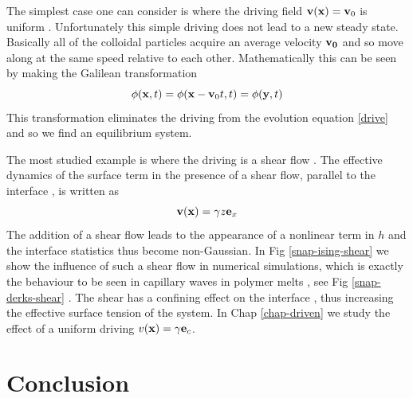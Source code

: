 The simplest case one can consider is where the driving field ${\bf v}({\bf x}) ={\bf v}_0$ is uniform \cite{leung_field_1986,bray_coarsening_2000}. Unfortunately this simple driving does not lead to a new steady state. Basically all of the colloidal particles acquire an average velocity ${\bf v_0}$ and so move along at the same speed relative to each other. Mathematically this can be seen by making the Galilean transformation
\begin{equation}
\phi ({\bf x},t)= \phi({\bf x}-{\bf v}_0t,t) = \phi({\bf y},t)
\end{equation}
This transformation eliminates the driving from the evolution equation \eqref{drive} and so we find an equilibrium system. 

The most studied example is where the driving is a shear flow \cite{derks_suppression_2006,thiebaud_nonequilibrium_2010}. The effective dynamics of the surface term in the presence of a shear flow, parallel to the interface \cite{bray_interface_2001,bray_interface_2001-1}, is written as
\begin{equation}
{\bf v}({\bf x}) = \gamma z {\bf e}_x
\label{eq-cisaillement}
\end{equation}
 The addition of a shear flow leads to the appearance of a nonlinear term in $h$ and the interface statistics thus become non-Gaussian. In Fig \ref{snap-ising-shear} we show the influence of such a shear flow in numerical simulations, which is exactly the behaviour to be seen in capillary waves in polymer melts \cite{derks_confocal_2004,derks_suppression_2006}, see Fig \ref{snap-derks-shear} . The shear has a confining effect on the interface \cite{smith_driven_2010,smith_interfaces_2008-1,smith_interfaces_2008}, thus increasing the effective surface tension of the system.
In Chap \ref{chap-driven} we study the effect of a uniform driving $v({\bf x}) = \gamma {\bf e}_c$.



\section{Conclusion}

